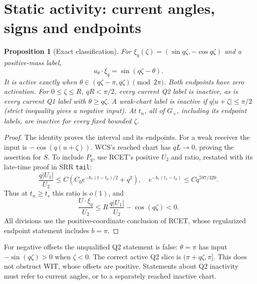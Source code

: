 \documentclass[11pt]{article}
\numberwithin{equation}{section}
\newtheorem{proposition}[theorem]{Proposition}
\theoremstyle{remark}\newtheorem{remark}[theorem]{Remark}
\newcommand{\Gp}{{G_+}}\newcommand{\CC}{\mathcal C}
\begin{document}
\section{Static activity: current angles, signs and endpoints}
\label{an07cwiv1:activity}
\begin{proposition}[Exact classification]
\label{an07cwiv1:signs}
For \(\xi_q(\zeta)=(\sin q\zeta,-\cos q\zeta)\) and a
positive-mass label,
\[
 a_\theta\cdot\xi_q=\sin(q\zeta-\theta).
 \]
It is active exactly when
\(\theta\in(q\zeta-\pi,q\zeta)\pmod{2\pi}\). Both endpoints
have zero activation. For \(0\le\zeta\le R\), \(qR<\pi/2\),
every current Q2 label is inactive, as is every current Q1
label with \(\theta\ge q\zeta\). A weak-chart label is inactive
if \(q|u+\zeta|\le\pi/2\) (strict inequality gives a negative
input). At \(t_n\), all of \(\Gp\), including its endpoint labels,
are inactive for every fixed bounded \(\zeta\).
\end{proposition}
\begin{proof}
The identity proves the interval and its endpoints.
For a weak receiver the input is \(-\cos(q(u+\zeta))\).
WCS's reached chart has \(qL\to0\), proving the assertion for \(S\).
To include \(P_q\), use RCET's positive \(U_2\) and ratio,
restated with its late-time proof in SRR \texttt{tail}:
\[
 \frac{q|U_1|}{U_2}
 \le C(C_0e^{-b_*(t-t_0)/2}+q^2),\quad
 e^{-b_*(t_s-t_0)}\le Cq^{597/320}.
 \]
Thus at \(t_n\ge t_s\) this ratio is \(o(1)\), and
\[
 \frac{U\cdot\xi_q}{U_2}
 \le R\,\frac{q|U_1|}{U_2}-\cos(q\zeta)<0 .
 \]
All divisions use the positive-coordinate conclusion of RCET,
whose regularized endpoint statement includes \(b=\pi\).
\end{proof}
For negative offsets the unqualified Q2 statement is false:
\(\theta=\pi\) has input \(-\sin(q\zeta)>0\) when \(\zeta<0\).
The correct active Q2 slice is \((\pi+q\zeta,\pi]\).
This does not obstruct WIT, whose offsets are positive.
Statements about Q2 inactivity must refer to current angles,
or to a separately reached inactive chart.
\end{document}
